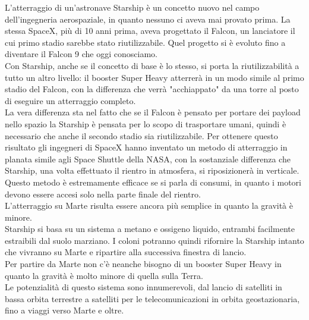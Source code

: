 L'atterraggio di un'astronave Starship è un concetto nuovo nel campo dell'ingegneria aerospaziale, in quanto nessuno ci aveva mai provato prima. La stessa SpaceX, più di 10 anni prima, aveva progettato il Falcon, un lanciatore il cui primo stadio sarebbe stato riutilizzabile. Quel progetto si è evoluto fino a diventare il Falcon 9 che oggi conosciamo.\\
Con Starship, anche se il concetto di base è lo stesso, si porta la riutilizzabilità a tutto un altro livello: il booster Super Heavy atterrerà in un modo simile al primo stadio del Falcon, con la differenza che verrà "acchiappato" da una torre al posto di eseguire un atterraggio completo.\\
La vera differenza sta nel fatto che se il Falcon è pensato per portare dei payload nello spazio la Starship è pensata per lo scopo di trasportare umani, quindi è necessario che anche il secondo stadio sia riutilizzabile. Per ottenere questo risultato gli ingegneri di SpaceX hanno inventato un metodo di atterraggio in planata simile agli Space Shuttle della NASA, con la sostanziale differenza che Starship, una volta effettuato il rientro in atmosfera, si riposizionerà in verticale.\\
Questo metodo è estremamente efficace se si parla di consumi, in quanto i motori devono essere accesi solo nella parte finale del rientro. \\
L'atterraggio su Marte risulta essere ancora più semplice in quanto la gravità è minore.\\
Starship si basa su un sistema a metano e ossigeno liquido, entrambi facilmente estraibili dal suolo marziano. I coloni potranno quindi rifornire la Starship intanto che vivranno su Marte e ripartire alla successiva finestra di lancio.\\
Per partire da Marte non c'è neanche bisogno di un booster Super Heavy in quanto la gravità è molto minore di quella sulla Terra.\\
Le potenzialità di questo sistema sono innumerevoli, dal lancio di satelliti in bassa orbita terrestre a satelliti per le telecomunicazioni in orbita geostazionaria, fino a viaggi verso Marte e oltre.\\
\\
\\
\\
